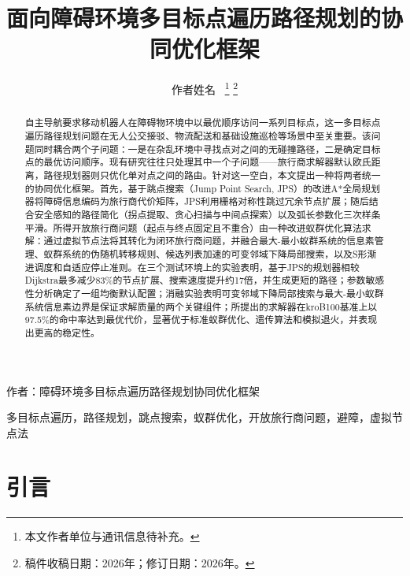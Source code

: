 \documentclass[lettersize,journal]{IEEEtran}
\begin{document}
\title{面向障碍环境多目标点遍历路径规划的协同优化框架}

\author{作者姓名~%
\thanks{本文作者单位与通讯信息待补充。}%
\thanks{稿件收稿日期：2026年；修订日期：2026年。}}

%
{作者：障碍环境多目标点遍历路径规划协同优化框架}

\maketitle

\begin{abstract}

自主导航要求移动机器人在障碍物环境中以最优顺序访问一系列目标点，这一多目标点遍历路径规划问题在无人公交接驳、物流配送和基础设施巡检等场景中至关重要。该问题同时耦合两个子问题：一是在杂乱环境中寻找点对之间的无碰撞路径，二是确定目标点的最优访问顺序。现有研究往往只处理其中一个子问题——旅行商求解器默认欧氏距离，路径规划器则只优化单对点之间的路由。针对这一空白，本文提出一种将两者统一的协同优化框架。首先，基于跳点搜索（Jump Point Search, JPS）的改进A*全局规划器将障碍信息编码为旅行商代价矩阵，JPS利用栅格对称性跳过冗余节点扩展；随后结合安全感知的路径简化（拐点提取、贪心扫描与中间点探索）以及弧长参数化三次样条平滑。所得开放旅行商问题（起点与终点固定且不重合）由一种改进蚁群优化算法求解：通过虚拟节点法将其转化为闭环旅行商问题，并融合最大-最小蚁群系统的信息素管理、蚁群系统的伪随机转移规则、候选列表加速的可变邻域下降局部搜索，以及S形渐进调度和自适应停止准则。在三个测试环境上的实验表明，基于JPS的规划器相较Dijkstra最多减少83\%的节点扩展、搜索速度提升约17倍，并生成更短的路径；参数敏感性分析确定了一组均衡默认配置；消融实验表明可变邻域下降局部搜索与最大-最小蚁群系统信息素边界是保证求解质量的两个关键组件；所提出的求解器在kroB100基准上以97.5\%的命中率达到最优代价，显著优于标准蚁群优化、遗传算法和模拟退火，并表现出更高的稳定性。

\end{abstract}

\begin{IEEEkeywords}

多目标点遍历，路径规划，跳点搜索，蚁群优化，开放旅行商问题，避障，虚拟节点法

\end{IEEEkeywords}

\section{引言}
\end{document}
